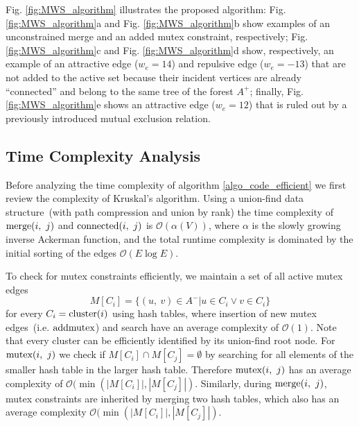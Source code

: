 Fig. \ref{fig:MWS_algorithm} illustrates the proposed algorithm: Fig. \ref{fig:MWS_algorithm}a and Fig. \ref{fig:MWS_algorithm}b show examples of an unconstrained merge and an added mutex constraint, respectively; Fig. \ref{fig:MWS_algorithm}c and Fig. \ref{fig:MWS_algorithm}d show, respectively, an example of an attractive edge ($w_e=14$) and repulsive edge ($w_e=-13$) that are not added to the active set because their incident vertices  are already ``connected'' and belong to the same tree of the forest $A^+$; finally, Fig. \ref{fig:MWS_algorithm}e shows an attractive edge ($w_e=12$) that is ruled out by a previously introduced mutual exclusion relation.


\subsection{Time Complexity Analysis}


Before analyzing the time complexity of algorithm \ref{algo_code_efficient} we first review the complexity of Kruskal's algorithm. Using a union-find data structure~(with path compression and union by rank) the time complexity of $\textrm{merge}(i,~j)$ and $\textrm{connected}(i,~j)$ is $\mathcal{O}(\alpha(V))$, where $\alpha$ is the slowly growing inverse Ackerman function, and the total runtime complexity is dominated by the initial sorting of the edges $\mathcal{O}(E \log E)$\cite{cormen2009introduction}.

\noindent To check for mutex constraints efficiently, we maintain a set of all active mutex edges $$ M[C_i] = \{(u,~v) \in A^- | u \in C_i \lor v \in C_i\} $$ for every $C_i = \textrm{cluster}(i)$ using hash tables, where insertion of new mutex edges~(i.e. $\textrm{addmutex}$) and search have an average complexity of $\mathcal{O}(1)$. Note that every cluster can be efficiently identified by its union-find root node.
For $\textrm{mutex}(i,~j)$ we check if $M[C_i] \cap M[C_j] = \emptyset$ by searching for all elements of the smaller hash table in the larger hash table. Therefore $\textrm{mutex}(i,~j)$ has an average complexity of $\mathcal{O}(\min (|M[C_i]|, |M[C_j]|)$. %
Similarly, during $\textrm{merge}(i,~j)$, mutex constraints are inherited  by merging two hash tables, which also has an average complexity $\mathcal{O}(\min (|M[C_i]|, |M[C_j]|)$. 

